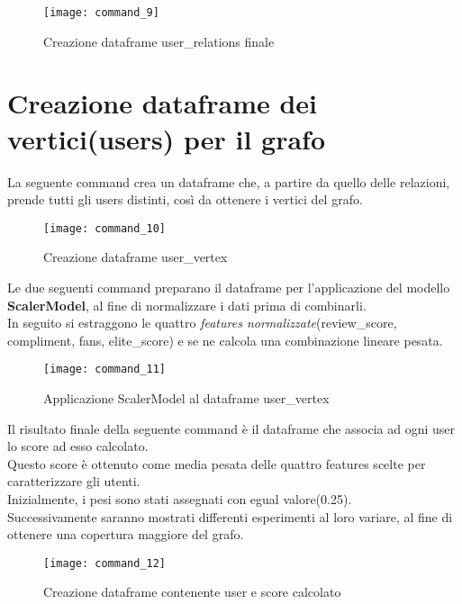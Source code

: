 \begin{figure}[!htbp]
	\texttt{[image: command\_9]}
	\caption{Creazione dataframe user\_relations finale}
	\label{command_9}
\end{figure}

\clearpage

\section{Creazione dataframe dei vertici(users) per il grafo}
La seguente command crea un dataframe che, a partire da quello delle relazioni,
prende tutti gli users distinti, così da ottenere i vertici
del grafo.
\begin{figure}[!htbp]
	\texttt{[image: command\_10]}
	\caption{Creazione dataframe user\_vertex}
	\label{command_10}
\end{figure}

Le due seguenti command preparano il dataframe per l'applicazione del modello
\textbf{ScalerModel}, al fine di normalizzare i dati prima di combinarli.\\
In seguito si estraggono le quattro \textit{features normalizzate}(review\_score,
compliment, fans, elite\_score) e se ne calcola una combinazione lineare pesata.
\begin{figure}[!htbp]
	\texttt{[image: command\_11]}
	\caption{Applicazione ScalerModel al dataframe user\_vertex}
	\label{command_11}
\end{figure}

\clearpage

Il risultato finale della seguente command è il dataframe che associa ad ogni user
lo score ad esso calcolato.\\
Questo score è ottenuto come media pesata delle quattro features scelte per
caratterizzare gli utenti.\\
Inizialmente, i pesi sono stati assegnati con egual valore(0.25).\\
Successivamente saranno mostrati differenti esperimenti al loro variare, al fine
di ottenere una copertura maggiore del grafo.
\begin{figure}[!htbp]
 	\texttt{[image: command\_12]}
 	\caption{Creazione dataframe contenente user e score calcolato}
 	\label{command_12}
\end{figure}
